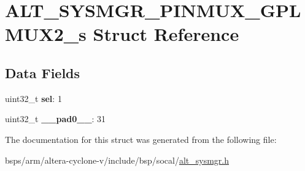 \hypertarget{structALT__SYSMGR__PINMUX__GPLMUX2__s}{}\section{A\+L\+T\+\_\+\+S\+Y\+S\+M\+G\+R\+\_\+\+P\+I\+N\+M\+U\+X\+\_\+\+G\+P\+L\+M\+U\+X2\+\_\+s Struct Reference}
\label{structALT__SYSMGR__PINMUX__GPLMUX2__s}
\subsection*{Data Fields}
\begin{DoxyCompactItemize}
\item 
\mbox{\label{structALT__SYSMGR__PINMUX__GPLMUX2__s_a82f0e0ba1e7e7dcb8d8a6c74b0b11a1c}} 
uint32\+\_\+t {\bfseries sel}\+: 1
\item 
\mbox{\label{structALT__SYSMGR__PINMUX__GPLMUX2__s_ad69859c09946eca6c973333415857dfd}} 
uint32\+\_\+t {\bfseries \+\_\+\+\_\+pad0\+\_\+\+\_\+}\+: 31
\end{DoxyCompactItemize}


The documentation for this struct was generated from the following file\+:\begin{DoxyCompactItemize}
\item 
bsps/arm/altera-\/cyclone-\/v/include/bsp/socal/\mbox{\hyperlink{alt__sysmgr_8h}{alt\+\_\+sysmgr.\+h}}\end{DoxyCompactItemize}
